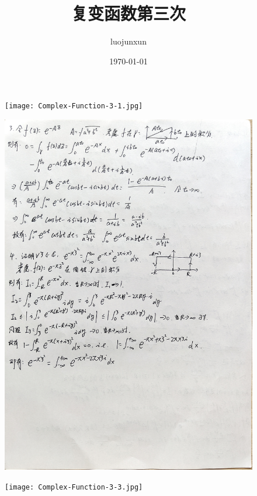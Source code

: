 \documentclass[12pt, a4paper, oneside]{ctexart}
\title{\huge\textbf{复变函数第三次}}
\author{luojunxun}
\date{\today}
\begin{document}
\begin{figure}[p]
    \centerline{\texttt{[image: Complex-Function-3-1.jpg]}}
\end{figure}

\begin{figure}[p]
    \centerline{\includegraphics[width=1.2\linewidth,height=1.1\textheight]{Complex-Function-3-2.jpg}}
\end{figure}


\begin{figure}[p]
    \centerline{\texttt{[image: Complex-Function-3-3.jpg]}}
\end{figure}




% 
% 
\end{document}
